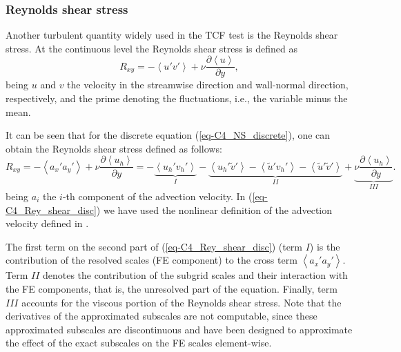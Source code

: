 \subsubsection{Reynolds shear stress}

Another turbulent quantity widely used in the TCF test is the Reynolds shear stress. At the continuous level the Reynolds shear stress is defined as
\begin{equation}
\label{eq-C4_Rey_shear_cont}
R_{xy}=-\left\langle u'v'\right\rangle+\nu\frac{\partial\left\langle u\right\rangle}{\partial y},
\end{equation}
being $u$ and $v$ the velocity in the streamwise direction and wall-normal direction, respectively,
and the prime denoting the fluctuations, i.e., the variable minus the mean.

It can be seen that for the discrete equation (\ref{eq-C4_NS_discrete}), one can obtain the Reynolds shear stress defined as follows:
\begin{equation}
\label{eq-C4_Rey_shear_disc}
R_{xy}=-\left\langle a_x'a_y'\right\rangle+\nu\frac{\partial\left\langle u_h\right\rangle}{\partial y}=-\underbrace{\left\langle u_h'v_h'\right\rangle}_I-\underbrace{\left\langle u_h'\tilde{v}'\right\rangle-\left\langle \tilde{u}'v_h'\right\rangle-\left\langle \tilde{u}'\tilde{v}'\right\rangle}_{II}+\underbrace{\nu\frac{\partial\left\langle u_h\right\rangle}{\partial y}}_{III}.
\end{equation}
being $a_i$ the $i$-th component of the advection velocity. In (\ref{eq-C4_Rey_shear_disc}) we have used the nonlinear definition of the advection velocity defined in .

The first term on the second part of  (\ref{eq-C4_Rey_shear_disc}) (term $I$) is the contribution of the resolved scales (FE component) to the cross term $\left\langle a_x'a_y'\right\rangle$. Term $II$ denotes the contribution of the subgrid scales and their interaction with the FE components, that is, the unresolved part of the equation. Finally, term $III$ accounts for the viscous portion of the Reynolds shear stress. Note that the derivatives of the approximated subscales are not computable, since these approximated subscales are discontinuous and have been designed to approximate the effect of the exact subscales on the FE scales element-wise. 

